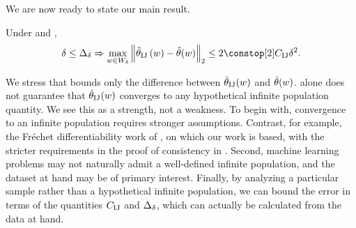 We are now ready to state our main result.
%
\begin{thm}
\label{thmref:paper_ij_error}Under
\paperallcoreassum and ,
\begin{align*}
\delta\le \deltasize \Rightarrow
\max_{w\in W_{\delta}}\norm{\thetaij\left(w\right)-{\thetapw}}_{2}
    \le 2 \constop[2] \constij \delta^{2}.
\end{align*}
\end{thm}
%
We stress that  bounds only the difference between
$\hat{\theta}_{\textrm{IJ}}(w)$ and $\hat{\theta}(w)$.   alone does not
guarantee that $\hat{\theta}_{\textrm{IJ}}(w)$ converges to any hypothetical infinite population
quantity. We see this as a strength, not a weakness.  To begin with, convergence
to an infinite population requires stronger assumptions.  Contrast, for example,
the Fr{\'e}chet differentiability work of \citet{clarke:1983:uniqueness}, on which
our work is based, with the stricter requirements in the proof of consistency in
\cite{shao:1993:jackknifemestimator}.  Second, machine learning problems may not
naturally admit a well-defined infinite population, and the dataset at hand may
be of primary interest. Finally, by  analyzing a particular sample rather than a
hypothetical infinite population, we can bound the error in terms of the
quantities $C_{\textrm{IJ}}$ and $\Delta_{\delta}$, which can actually be calculated from the
data at hand.

